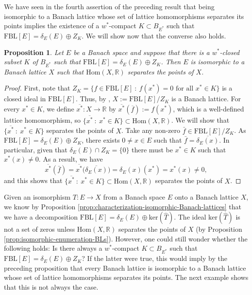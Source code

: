 \documentclass[11pt]{amsart}
\newtheorem{prop}[thm]{Proposition}
\theoremstyle{definition}
\numberwithin{equation}{section}
\newcommand{\fbl}{\text{FBL}}
\begin{document}
We have seen in the fourth assertion of the preceding result that being isomorphic to a Banach lattice whose set of lattice homomorphisms separates its points implies the existence of a $w^*$-compact $K\subset B_{E^*}$ such that $\fbl[E]=\delta_E(E)\oplus Z_K$. We will show now that the converse also holds.

\begin{prop}\label{prop:isomorphic-zeros}
    Let $E$ be a Banach space and suppose that there is a $w^*$-closed subset $K$ of $B_{E^*}$ such that $\fbl[E]=\delta_E(E)\oplus Z_K$. Then $E$ is isomorphic to a Banach lattice $X$ such that $\text{Hom}(X,\mathbb{R})$ separates the points of $X$.
\end{prop}
\begin{proof}
First, note that $Z_K=\{f\in \fbl[E]\::\: f(x^*)=0 \text{ for all } x^*\in K\}$ is a closed ideal in $\fbl[E]$. Thus, by \cite[Corollary 1.3.14]{M-N-book}, $X:=\fbl[E]/Z_K$ is a Banach lattice. For every $x^*\in K$, we define $\overline{x^*}:X\to\mathbb{R}$ by $\overline{x^*}(\overline{f}):=f(x^*)$, which is a well-defined lattice homomorphism, so $\{\overline{x^*}\::\: x^*\in K\}\subset \text{Hom}(X,\mathbb{R})$. We will show that $\{\overline{x^*}\::\: x^*\in K\}$ separates the points of $X$. Take any non-zero $\bar{f}\in \fbl[E]/Z_K$. As $\fbl[E]=\delta_E(E)\oplus Z_K$, there exists $0\neq x\in E$ such that $\bar{f}=\overline{\delta_E(x)}$. In particular, given that $\delta_E(E)\cap Z_K=\{0\}$ there must be $x^*\in K$ such that $x^*(x)\neq 0$. As a result, we have
$$
\overline{x^*}(\bar{f})=\overline{x^*}\bigl(\overline{\delta_E(x)}\bigr)=\delta_E(x)(x^*)=x^*(x)\neq 0,
$$
and this shows that $\{\overline{x^*}\::\: x^*\in K\}\subset \text{Hom}(X,\mathbb{R})$ separates the points of $X$.
\end{proof}

Given an isomorphism $T:E\to X$ from a Banach space $E$ onto a Banach lattice $X$, we know by Proposition \ref{prop:characterization-isomorphic-Banach-lattices} that we have a decomposition $\fbl[E]=\delta_E(E)\oplus \text{ker}(\widehat{T})$. The ideal $\text{ker}(\widehat{T})$ is not a set of zeros unless $\text{Hom}(X,\mathbb{R})$ separates the points of $X$ (by Proposition \ref{prop:isomorphic-enumeration-BLs}). However, one could still wonder whether the following holds: Is there always a $w^*$-compact $K\subset B_{E^*}$ such that $\fbl[E]=\delta_E(E)\oplus Z_K$? If the latter were true, this would imply by the preceding proposition that every Banach lattice is isomorphic to a Banach lattice whose set of lattice homomorphisms separates its points. The next example shows that this is not always the case.
\end{document}
